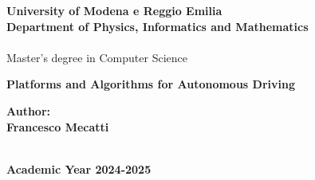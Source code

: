 \documentclass[12pt,a4paper,twoside,onecolumn,openright]{book}
\begin{document}
\begin{sloppypar}

\begin{titlepage}
\begin{center} {
    \large
    \textbf{University of Modena e Reggio Emilia} \\
     \textbf{Department of Physics, Informatics and Mathematics} \\
    \hspace*{0cm} \hrulefill \hspace*{0cm} \\
    Master's degree in Computer Science
    
    \begin{spacing}{1}
        \huge{\bf Platforms and Algorithms for Autonomous Driving}
    \end{spacing}
}
\vspace{3mm}
\end{center}

\vspace{40mm}
\par
\noindent
\hfill
\begin{minipage}[t]{0.47\textwidth}\raggedleft
{\large{\bf Author:\\ Francesco Mecatti}}
\end{minipage}
\vspace{10mm}

\begin{center}
\hspace*{0cm} \hrulefill \hspace*{0cm} \\
\vspace{5mm}
{\large{\bf Academic Year 2024-2025}}
\end{center}
\end{titlepage}

\setlength{\parindent}{0pt}
\setlength{\parskip}{1ex plus 0.5ex minus 0.2ex}
\frontmatter
\mainmatter

\newcommand{\whitepage}{\hbox{}\thispagestyle{empty}\newpage}

\renewcommand{\contentsname}{Table of Contents} \tableofcontents







\end{sloppypar}
\end{document}
